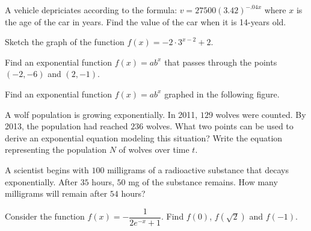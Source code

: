 \begin{exercise}
  A vehicle depriciates according to the formula: $v=27500\left(3.42\right)^{-.04x}$ where $x$ is the age of the car in years. Find the value of the car when it is 14-years old.
\end{exercise}

\begin{exercise}
  Sketch the graph of the function $f(x)=-2\cdot 3^{x-2}+2$.
\end{exercise}

\begin{exercise}
  Find an exponential function $f(x)=ab^x$ that passes through the points $(-2,-6)$ and $(2,-1)$.
\end{exercise}

\newpage

\begin{exercise}
  Find an exponential function $f(x)=ab^x$ graphed in the following figure.\\
\end{exercise}
\vspace*{-0.25\textheight}

\begin{exercise}
  A wolf population is growing exponentially. In 2011, $129$ wolves were counted. By 2013, the population had reached $236$ wolves. What two points can be used to derive an exponential equation modeling this situation? Write the equation representing the population $N$ of wolves over time $t$.
\end{exercise}

\begin{exercise}
  A scientist begins with $100$ milligrams of a radioactive substance that decays exponentially. After $35$ hours, $50$ mg of the substance remains. How many milligrams will remain after $54$ hours?
\end{exercise}

\newpage

\begin{exercise}
  Consider the function $f(x)=-\dfrac{1}{2e^{-x}+1}$. Find $f(0)$, $f(\sqrt{2})$ and $f(-1)$.
\end{exercise}


